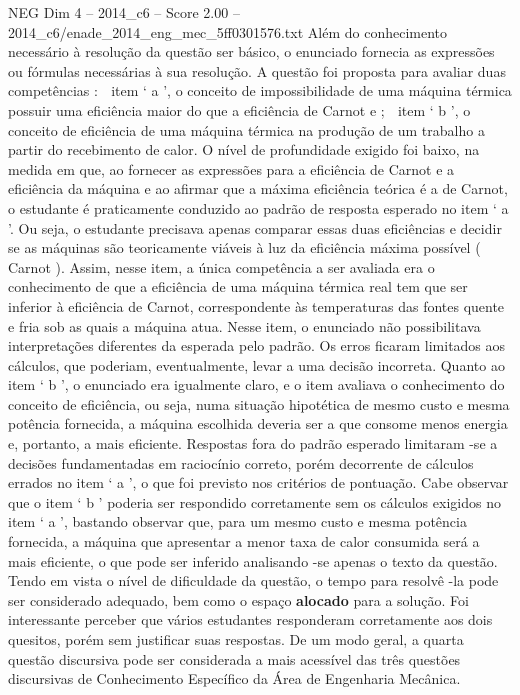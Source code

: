 \begin{textsample}{NEG Dim 4 – 2014\_c6 – Score 2.00 – 2014\_c6/enade\_2014\_eng\_mec\_5ff0301576.txt}
Além do conhecimento necessário à resolução da questão ser básico, o enunciado fornecia as expressões ou fórmulas necessárias à sua resolução.
A questão foi proposta para avaliar duas competências :  item ‘ a ’, o conceito de impossibilidade de uma máquina térmica possuir uma eficiência maior do que a eficiência de Carnot e ;  item ‘ b ’, o conceito de eficiência de uma máquina térmica na produção de um trabalho a partir do recebimento de calor.
O nível de profundidade exigido foi baixo, na medida em que, ao fornecer as expressões para a eficiência de Carnot e a eficiência da máquina e ao afirmar que a máxima eficiência teórica é a de Carnot, o estudante é praticamente conduzido ao padrão de resposta esperado no item ‘ a ’.
Ou seja, o estudante precisava apenas comparar essas duas eficiências e decidir se as máquinas são teoricamente viáveis à luz da eficiência máxima possível ( Carnot ).
Assim, nesse item, a única competência a ser avaliada era o conhecimento de que a eficiência de uma máquina térmica real tem que ser inferior à eficiência de Carnot, correspondente às temperaturas das fontes quente e fria sob as quais a máquina atua.
Nesse item, o enunciado não possibilitava interpretações diferentes da esperada pelo padrão.
Os erros ficaram limitados aos cálculos, que poderiam, eventualmente, levar a uma decisão incorreta.
Quanto ao item ‘ b ’, o enunciado era igualmente claro, e o item avaliava o conhecimento do conceito de eficiência, ou seja, numa situação hipotética de mesmo custo e mesma potência fornecida, a máquina escolhida deveria ser a que consome menos energia e, portanto, a mais eficiente.
Respostas fora do padrão esperado limitaram -se a decisões fundamentadas em raciocínio correto, porém decorrente de cálculos errados no item ‘ a ’, o que foi previsto nos critérios de pontuação.
Cabe observar que o item ‘ b ’ poderia ser respondido corretamente sem os cálculos exigidos no item ‘ a ’, bastando observar que, para um mesmo custo e mesma potência fornecida, a máquina que apresentar a menor taxa de calor consumida será a mais eficiente, o que pode ser inferido analisando -se apenas o texto da questão.
Tendo em vista o nível de dificuldade da questão, o tempo para resolvê -la pode ser considerado adequado, bem como o espaço \textbf{alocado} para a solução.
Foi interessante perceber que vários estudantes responderam corretamente aos dois quesitos, porém sem justificar suas respostas.
De um modo geral, a quarta questão discursiva pode ser considerada a mais acessível das três questões discursivas de Conhecimento Específico da Área de Engenharia Mecânica.

\end{textsample}
